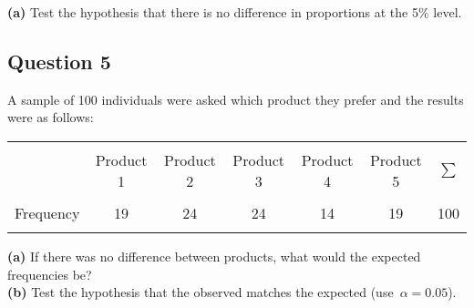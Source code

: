 \documentclass[a4paper,12pt]{article}
\begin{document}
{\bf(a)} Test the hypothesis that there is no difference in proportions at the 5\% level.



\subsection*{Question 5}
A sample of 100 individuals were asked which product they prefer and the results were as follows:  \\[-0.2cm]
\begin{center}
\begin{tabular}{|c|ccccc|c|}
\hline
&&&&&&\\[-0.3cm]
 & Product 1 & Product 2 & Product 3 & Product 4 & Product 5 & $\sum$ \\[0.1cm]
\hline
&&&&&&\\[-0.3cm]
Frequency & 19 & 24 & 24 & 14 & 19 & 100\\[0.1cm]
\hline
\multicolumn{7}{c}{}\\[-0.3cm]
\end{tabular}
\end{center}

{\bf(a)} If there was no difference between products, what would the expected frequencies be? \quad \\{\bf(b)} Test the hypothesis that the observed matches the expected \mbox{(use $\alpha=0.05$)}.
\end{document}
